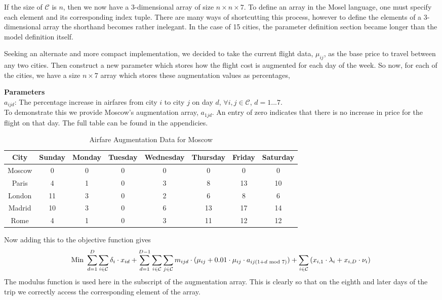 \documentclass[12pt]{article}
\begin{document}
If the size of $\mathcal{C}$ is $n$, then we now have a 3-dimensional array of size $n\times n\times 7$. To define an array in the Mosel language, one must specify each element and its corresponding index tuple. There are many ways of shortcutting this process, however to define the elements of a 3-dimensional array the shorthand becomes rather inelegant. In the case of 15 cities, the parameter definition section became longer than the model definition itself.

Seeking an alternate and more compact implementation, we decided to take the current flight data, $\mu_{ij}$, as the base price to travel between any two cities. Then construct a new parameter which stores how the flight cost is augmented for each day of the week. So now, for each of the cities, we have a size $n \times 7$ array which stores these augmentation values as percentages,

\textbf{Parameters} \\
$a_{ijd}$: The percentage increase in airfares from city $i$ to city $j$ on day $d$, $\forall i,j \in \mathcal{C}$, $d=1...7$.\\

To demonstrate this we provide Moscow's augmentation array, $a_{1jd}$. An entry of zero indicates that there is no increase in price for the flight on that day. The full table can be found in the appendicies.\\
\begin{table}[h]
	\caption{Airfare Augmentation Data for Moscow}
	\centering
	\vspace{1mm}
	\begin{tabular}{c|c|c|c|c|c|c|c}
		\hline
		\rule{0pt}{2ex} City & Sunday & Monday & Tuesday & Wednesday & Thursday & Friday & Saturday \\
		\hline
		\rule{0pt}{2ex}Moscow & 0 & 0 & 0 & 0 & 0 & 0 & 0 \\
		Paris & 4 & 1 & 0 & 3 & 8 & 13 & 10 \\
		London & 11 & 3 & 0 & 2 & 6 & 8 & 6 \\
		Madrid & 10 & 3 & 0 & 6 & 13 & 17 & 14 \\
		Rome & 4 & 1 & 0 & 3 & 11 & 12 & 12 \\
	\end{tabular}
\end{table}

Now adding this to the objective function gives
\begin{equation*}
\text{Min } \sum_{d=1}^{D} \sum_{i \in \mathcal{C}} \delta_{i} \cdot x_{id} + \sum_{d=1}^{D-1} \sum_{i \in \mathcal{C}} \sum_{j \in \mathcal{C}} m_{ijd} \cdot (\mu_{ij} + 0.01 \cdot \mu_{ij} \cdot a_{ij(1+d \text{ mod }7)}) + \sum_{i \in \mathcal{C}} \left( x_{i,1} \cdot \lambda_{i} + x_{i,D} \cdot \nu_{i} \right)\\
\end{equation*}
The modulus function is used here in the subscript of the augmentation array. This is clearly so that on the eighth and later days of the trip we correctly access the corresponding element of the array.
\end{document}
